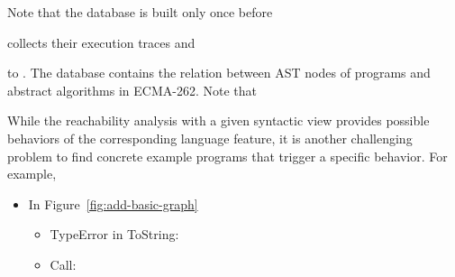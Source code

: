 Note that the database is built only once before 

collects their
execution traces and 

to .  The database contains the relation
between AST nodes of programs and abstract algorithms in ECMA-262.  Note that 

While the reachability analysis with a given syntactic view provides possible
behaviors of the corresponding language feature, it is another challenging
problem to find concrete example programs that trigger a specific behavior.  For
example,


\begin{itemize}
  \item In Figure~\ref{fig:add-basic-graph}
    \begin{itemize}
      \item TypeError in ToString:
      \item Call:
    \end{itemize}
\end{itemize}
